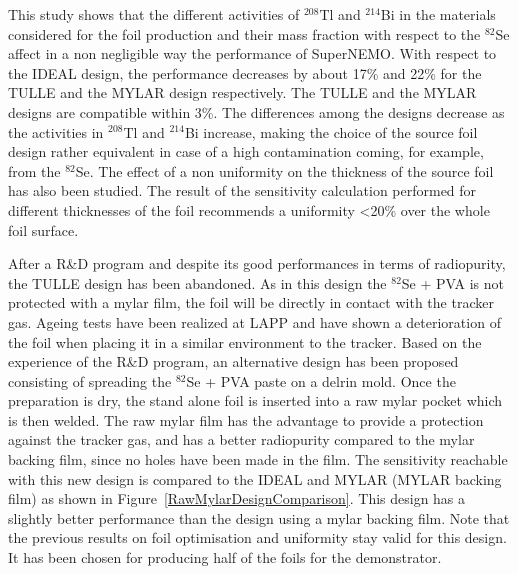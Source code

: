 \documentclass[main.tex]{subfiles}
\begin{document}
\NI This study shows that the different activities of $^{\text{208}}$Tl and $^{\text{214}}$Bi in the materials considered for the foil production and their mass fraction with respect to the $^{\text{82}}$Se affect in a non negligible way the performance of SuperNEMO. With respect to the IDEAL design, the performance decreases by about 17\% and 22\% for the TULLE and the MYLAR design respectively. The TULLE and the MYLAR designs are compatible within 3\%. The differences among the designs decrease as the activities in $^{\text{208}}$Tl and $^{\text{214}}$Bi increase, making the choice of the source foil design rather equivalent in case of a high contamination coming, for example, from the $^{\text{82}}$Se. The effect of a non uniformity on the thickness of the source foil has also been studied. The result of the sensitivity calculation performed for different thicknesses of the foil recommends a uniformity <20\% over the whole foil surface.


\bigskip


\NI After a R\&D program and despite its good performances in terms of radiopurity, the TULLE design has been abandoned. As in this design the $^{\text{82}}$Se + PVA is not protected with a mylar film, the foil will be directly in contact with the tracker gas. Ageing tests have been realized at LAPP and have shown a deterioration of the foil when placing it in a similar environment to the tracker. Based on the experience of the R\&D program, an alternative design has been proposed consisting of spreading the $^{\text{82}}$Se + PVA paste on a delrin mold. Once the preparation is dry, the stand alone foil is inserted into a raw mylar pocket which is then welded. The raw mylar film has the advantage to provide a protection against the tracker gas, and has a better radiopurity compared to the mylar backing film, since no holes have been made in the film. The sensitivity reachable with this new design is compared to the IDEAL and MYLAR (MYLAR backing film) as shown in Figure~\ref{RawMylarDesignComparison}. This design has a slightly better performance than the design using a mylar backing film. Note that the previous results on foil optimisation and uniformity stay valid for this design. It has been chosen for producing half of the foils for the demonstrator.
 

\end{document}
